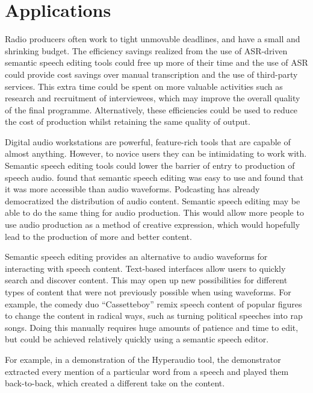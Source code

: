 
\section{Applications}

Radio producers often work to tight unmovable deadlines, and have a small and shrinking budget. The efficiency savings
realized from the use of ASR-driven semantic speech editing tools could free up more of their time and the use of ASR
could provide cost savings over manual transcription and the use of third-party services. This extra time could be
spent on more valuable activities such as research and recruitment of interviewees, which may improve the overall
quality of the final programme. Alternatively, these efficiencies could be used to reduce the cost of production whilst
retaining the same quality of output.

Digital audio workstations are powerful, feature-rich tools that are capable of almost anything. However, to novice
users they can be intimidating to work with. Semantic speech editing tools could lower the barrier of entry to
production of speech audio. \citet{Yoon2014} found that semantic speech editing was easy to use and
\citet{Sivaraman2016} found that it was more accessible than audio waveforms. Podcasting has already democratized the
distribution of audio content. Semantic speech editing may be able to do the same thing for audio production. This
would allow more people to use audio production as a method of creative expression, which would hopefully lead to the
production of more and better content.

Semantic speech editing provides an alternative to audio waveforms for interacting with speech content. Text-based
interfaces allow users to quickly search and discover content. This may open up new possibilities for different types
of content that were not previously possible when using waveforms. For example, the comedy duo ``Cassetteboy'' remix
speech content of popular figures to change the content in radical ways, such as turning political speeches into rap
songs. Doing this manually requires huge amounts of patience and time to edit, but could be achieved relatively quickly
using a semantic speech editor.

For example, in a demonstration of the Hyperaudio tool, the demonstrator extracted every mention of a particular word
from a speech and played them back-to-back, which created a different take on the content.

